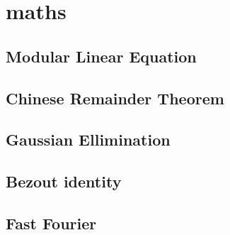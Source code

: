 \section{maths}
\subsection{Modular Linear Equation}
\subsection{Chinese Remainder Theorem}
\subsection{Gaussian Ellimination}
\subsection{Bezout identity}
\subsection{Fast Fourier}